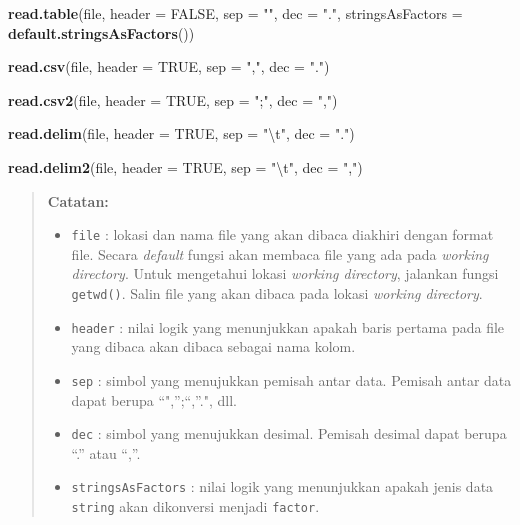 \documentclass[]{book}
\newenvironment{Shaded}{\begin{snugshade}}{\end{snugshade}}
\newcommand{\CharTok}[1]{\textcolor[rgb]{0.31,0.60,0.02}{#1}}
\newcommand{\DataTypeTok}[1]{\textcolor[rgb]{0.13,0.29,0.53}{#1}}
\newcommand{\KeywordTok}[1]{\textcolor[rgb]{0.13,0.29,0.53}{\textbf{#1}}}
\newcommand{\NormalTok}[1]{#1}
\newcommand{\OtherTok}[1]{\textcolor[rgb]{0.56,0.35,0.01}{#1}}
\newcommand{\StringTok}[1]{\textcolor[rgb]{0.31,0.60,0.02}{#1}}
\providecommand{\tightlist}{%
  \setlength{\itemsep}{0pt}\setlength{\parskip}{0pt}}
\theoremstyle{definition}
\theoremstyle{definition}
\theoremstyle{definition}
\theoremstyle{remark}
\begin{document}
\begin{Shaded}
\begin{Highlighting}[]
\KeywordTok{read.table}\NormalTok{(file, }\DataTypeTok{header =} \OtherTok{FALSE}\NormalTok{, }\DataTypeTok{sep =} \StringTok{""}\NormalTok{, }\DataTypeTok{dec =} \StringTok{"."}\NormalTok{,}
           \DataTypeTok{stringsAsFactors =} \KeywordTok{default.stringsAsFactors}\NormalTok{())}

\KeywordTok{read.csv}\NormalTok{(file, }\DataTypeTok{header =} \OtherTok{TRUE}\NormalTok{, }\DataTypeTok{sep =} \StringTok{","}\NormalTok{, }\DataTypeTok{dec =} \StringTok{"."}\NormalTok{)}

\KeywordTok{read.csv2}\NormalTok{(file, }\DataTypeTok{header =} \OtherTok{TRUE}\NormalTok{, }\DataTypeTok{sep =} \StringTok{";"}\NormalTok{, }\DataTypeTok{dec =} \StringTok{","}\NormalTok{)}

\KeywordTok{read.delim}\NormalTok{(file, }\DataTypeTok{header =} \OtherTok{TRUE}\NormalTok{, }\DataTypeTok{sep =} \StringTok{"}\CharTok{\textbackslash{}t}\StringTok{"}\NormalTok{, }\DataTypeTok{dec =} \StringTok{"."}\NormalTok{)}

\KeywordTok{read.delim2}\NormalTok{(file, }\DataTypeTok{header =} \OtherTok{TRUE}\NormalTok{, }\DataTypeTok{sep =} \StringTok{"}\CharTok{\textbackslash{}t}\StringTok{"}\NormalTok{, }\DataTypeTok{dec =} \StringTok{","}\NormalTok{)}
\end{Highlighting}
\end{Shaded}

\begin{quote}
\textbf{Catatan:}

\begin{itemize}
\tightlist
\item
  \texttt{file} : lokasi dan nama file yang akan dibaca diakhiri dengan format file. Secara \emph{default} fungsi akan membaca file yang ada pada \emph{working directory}. Untuk mengetahui lokasi \emph{working directory}, jalankan fungsi \texttt{getwd()}. Salin file yang akan dibaca pada lokasi \emph{working directory}.
\item
  \texttt{header} : nilai logik yang menunjukkan apakah baris pertama pada file yang dibaca akan dibaca sebagai nama kolom.
\item
  \texttt{sep} : simbol yang menujukkan pemisah antar data. Pemisah antar data dapat berupa ``",'';``,''.", dll.
\item
  \texttt{dec} : simbol yang menujukkan desimal. Pemisah desimal dapat berupa ``.'' atau ``,''.
\item
  \texttt{stringsAsFactors} : nilai logik yang menunjukkan apakah jenis data \texttt{string} akan dikonversi menjadi \texttt{factor}.
\end{itemize}
\end{quote}
\end{document}
